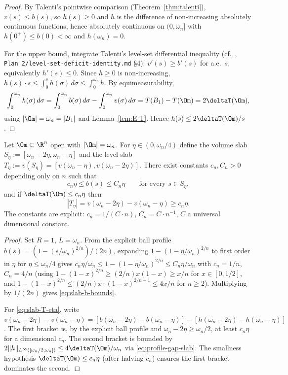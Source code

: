 \begin{proof}
By Talenti's pointwise comparison (Theorem~\ref{thm:talenti}),
$v(s)\le b(s)$, so $h(s)\ge 0$ and $h$ is the difference of
non-increasing absolutely continuous functions, hence absolutely
continuous on $(0,\omega_n]$ with $h(0^+)\le b(0)<\infty$ and
$h(\omega_n)=0$.

For the upper bound, integrate Talenti's level-set differential
inequality (cf.~\cite[\S4]{Talenti1976},
\texttt{Plan 2/level-set-deficit-identity.md} §4):
$v'(s)\ge b'(s)$ for a.e.\ $s$, equivalently $h'(s)\le 0$. Since
$h\ge 0$ is non-increasing,
$h(s)\cdot s\le\int_0^s h(\sigma)\,d\sigma\le\int_0^{\omega_n}h$. By
equimeasurability,
\[
   \int_0^{\omega_n}h(\sigma)\,d\sigma
   =\int_0^{\omega_n}b(\sigma)\,d\sigma-\int_0^{\omega_n}v(\sigma)\,d\sigma
   =T(B_1)-T(\Om)=2\deltaT(\Om),
\]
using $|\Om|=\omega_n=|B_1|$ and Lemma~\ref{lem:E-T}. Hence
$h(s)\le 2\deltaT(\Om)/s$.
\end{proof}

\begin{lemma}
\label{lem:slab-length}
Let $\Om\subset\R^n$ open with $|\Om|=\omega_n$. For
$\eta\in(0,\omega_n/4)$ define the volume slab $S_\eta:=[\omega_n-2\eta,\omega_n-\eta]$
and the level slab
$T_\eta:=v(S_\eta)=[v(\omega_n-\eta),v(\omega_n-2\eta)]$. There exist
constants $c_n,C_n>0$ depending only on $n$ such that
\begin{equation}\label{eq:slab-b-bounds}
   c_n\eta\le b(s)\le C_n\eta\qquad\text{for every }s\in S_\eta,
\end{equation}
and if $\deltaT(\Om)\le c_n\eta$ then
\begin{equation}\label{eq:slab-T-eta}
   |T_\eta|=v(\omega_n-2\eta)-v(\omega_n-\eta)\ge c_n\eta.
\end{equation}
The constants are explicit: $c_n=1/(C\cdot n)$, $C_n=C\cdot n^{-1}$,
$C$ a universal dimensional constant.
\end{lemma}

\begin{proof}
Set $R=1$, $L=\omega_n$. From the explicit ball profile
$b(s)=(1-(s/\omega_n)^{2/n})/(2n)$, expanding
$1-(1-\eta/\omega_n)^{2/n}$ to first order in $\eta$ for $\eta\le\omega_n/4$
gives
$c_n\eta/\omega_n\le 1-(1-\eta/\omega_n)^{2/n}\le C_n\eta/\omega_n$
with $c_n=1/n$, $C_n=4/n$ (using
$1-(1-x)^{2/n}\ge(2/n)x(1-x)\ge x/n$ for $x\in[0,1/2]$, and
$1-(1-x)^{2/n}\le(2/n)x\cdot(1-x)^{2/n-1}\le 4x/n$ for $n\ge 2$).
Multiplying by $1/(2n)$ gives \eqref{eq:slab-b-bounds}.

For \eqref{eq:slab-T-eta}, write
$v(\omega_n-2\eta)-v(\omega_n-\eta)
=[b(\omega_n-2\eta)-b(\omega_n-\eta)]
 -[h(\omega_n-2\eta)-h(\omega_n-\eta)]$.
The first bracket is, by the explicit ball profile and
$\omega_n-2\eta\ge\omega_n/2$, at least
$c_n\eta$ for a dimensional $c_n$. The second bracket is bounded by
$2\|h\|_{L^\infty([\omega_n/2,\omega_n])}\le 4\deltaT(\Om)/\omega_n$
via \eqref{eq:profile-gap-slab}. The smallness hypothesis
$\deltaT(\Om)\le c_n\eta$ (after halving $c_n$) ensures the first
bracket dominates the second.
\end{proof}

